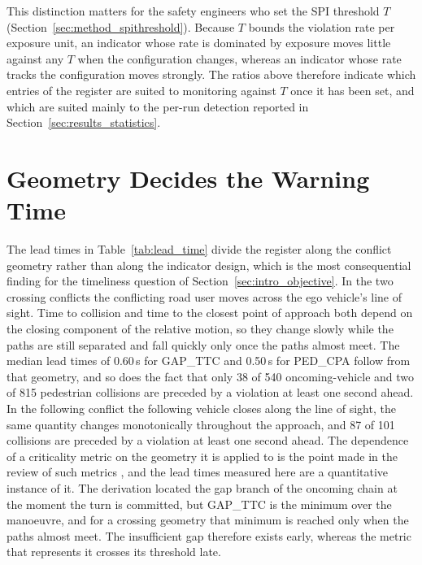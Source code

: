 This distinction matters for the safety engineers who set the SPI threshold $T$
(Section~\ref{sec:method_spithreshold}). Because $T$ bounds the violation rate per
exposure unit, an indicator whose rate is dominated by exposure moves little
against any $T$ when the configuration changes, whereas an indicator whose rate
tracks the configuration moves strongly. The ratios above therefore indicate which
entries of the register are suited to monitoring against $T$ once it has been set,
and which are suited mainly to the per-run detection reported in
Section~\ref{sec:results_statistics}.

\section{Geometry Decides the Warning Time}
\label{sec:disc_geometry}

The lead times in Table~\ref{tab:lead_time} divide the register along the
conflict geometry rather than along the indicator design, which is the most
consequential finding for the timeliness question of
Section~\ref{sec:intro_objective}. In the two crossing conflicts the conflicting road user moves across the ego vehicle's line of
sight. Time to collision and time to the closest point of approach both depend on
the closing component of the relative motion, so they change slowly while the
paths are still separated and fall quickly only once the paths almost meet. The
median lead times of 0.60\,s for GAP\_TTC and 0.50\,s for PED\_CPA follow from
that geometry, and so does the fact that only 38 of 540 oncoming-vehicle and two
of 815 pedestrian collisions are preceded by a violation at least one second
ahead. In the following conflict the following vehicle closes along the line of sight, the
same quantity changes monotonically throughout the approach, and 87 of 101
collisions are preceded by a violation at least one second ahead. The dependence
of a criticality metric on the geometry it is applied to is the point made in the
review of such metrics \cite{westhofen2023}, and the lead times measured here are
a quantitative instance of it. The derivation located the gap branch of the
oncoming chain at the moment the turn is committed, but GAP\_TTC is the minimum over
the manoeuvre, and for a crossing geometry that minimum is reached only when the
paths almost meet. The insufficient gap therefore exists early, whereas the metric
that represents it crosses its threshold late.

